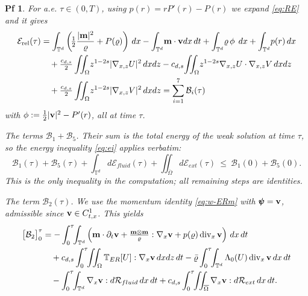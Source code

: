\documentclass[10pt,a4paper]{amsart}
\newtheorem{pf}{Pf}
\newcommand{\Divx}{\operatorname{div}_x}
\newcommand{\Erel}{\mathcal{E}_{\mathrm{rel}}}
\newcommand{\Gradx}{\nabla_x}
\newcommand{\Gradxz}{\nabla_{x,z}}
\newcommand{\Lambdaz}{\Lambda_0}
\newcommand{\T}{\mathbb{T}}
\newcommand{\dt}{{\,\rm d} t }
\newcommand{\dx}{{\,\rm d} {x}}
\newcommand{\dz}{{\rm d} z}
\newcommand{\lr}[1]{\left( #1 \right)}
\newcommand{\vc}[1]{{\bf #1}}
\newcommand{\vm}{\vc{m}}
\newcommand{\vr}{\varrho}
\newcommand{\vv}{\vc{v}}
\begin{document}
	\begin{pf}
		For a.e. $\tau \in (0,T)$, using $p(r)=rP'(r)-P(r)$ we expand \eqref{eq:RE} and it gives
		\begin{align*}
					\Erel(\tau)
				&=\int_{\mathbb T^d}\lr{\!\tfrac12 \frac{|\vm|^2}{\vr} +P(\vr)} \dx 
				-\int_{\mathbb T^d}\!\mathbf m\cdot\vv dx \dt 
				+\int_{\mathbb T^d}\!\vr\,\phi\;  \dx 
				+\int_{\mathbb T^d}\!p(r)\dx  \\
				&	\quad	+\tfrac{c_{d,s}}2\iint_\Omega\! z^{1-2s}|\Gradxz U|^2 \dx \dz 
				-c_{d,s}\!\iint_\Omega\! z^{1-2s}\Gradxz U\cdot\Gradxz V \dx \dz \\
				&\quad
				+\tfrac{c_{d,s}}2\iint_\Omega\! z^{1-2s}|\Gradxz V|^2 \dx \dz=\sum_{i=1}^{7} \mathcal{B}_i (\tau)
		\end{align*}
		with $\phi:=\tfrac12|\vv|^2-P'(r)$, all at time $\tau$.

		
		\smallskip
		\noindent\emph{The terms $\mathcal B_1+\mathcal B_5$.} Their sum is the total energy of the weak solution at time $\tau$, so the energy inequality \eqref{eq:ei} applies verbatim:
		\begin{equation}\label{B15}
			\mathcal B_1(\tau)+\mathcal B_5(\tau)+\int_{\mathbb T^d}d\mathcal E_{fluid}(\tau)+\iint_{\overline\Omega}d\mathcal E_{ext}(\tau)
			\ \le\ \mathcal B_1(0)+\mathcal B_5(0).
		\end{equation}
		This is the only inequality in the computation; all remaining steps are identities.

		\noindent\emph{The term $\mathcal B_2(\tau)$.} We use the momentum identity \eqref{eq:w-ERm} with $\pmb\psi=\vv$, admissible since $\vv\in C^1_{t,x}$.  This yields
		\begin{equation}\label{B2}
			\begin{aligned}
				\big[\mathcal B_2\big]_0^\tau
				&=-\int_0^\tau\!\!\int_{\mathbb T^d}\lr{\vm\cdot\partial_t\vv+\tfrac{\vm\otimes\vm}{\vr}:\Gradx\vv+p(\vr)\Divx\vv}\dx\dt\\
				&\quad+c_{d,s}\int_0^\tau\!\!\iint_\Omega\T_{\rm ER}[U]:\Gradx\vv \dx\dz\dt
				-\bar\vr\int_0^\tau\!\!\int_{\mathbb T^d}\Lambdaz(U)\Divx\vv \dx\dt\\
				&\quad-\int_0^\tau\!\!\int_{\mathbb T^d}\Gradx\vv:d\mathcal R_{fluid} \dx\dt
				+c_{d,s}\int_0^\tau\!\!\iint_{\overline\Omega}\Gradx\vv:d\mathcal R_{ext} \dx\dt .
			\end{aligned}
		\end{equation}


\end{pf}
\end{document}
